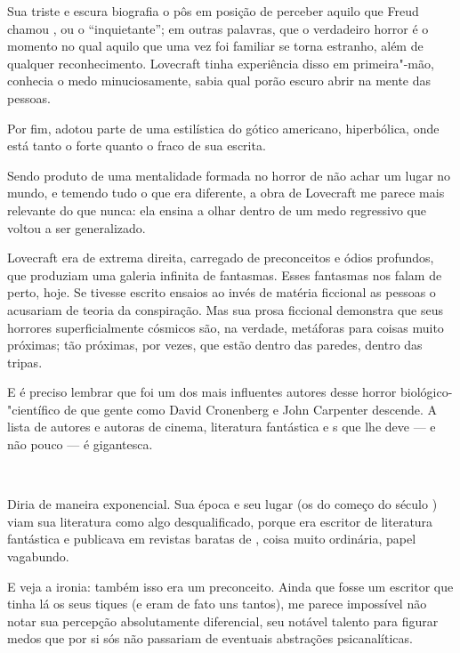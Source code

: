 \begin{changemargin}
Sua triste e escura biografia o pôs em posição de perceber aquilo que Freud chamou {}, ou o “inquietante”; em outras palavras, que o verdadeiro horror é o momento no qual aquilo que uma vez foi familiar se torna estranho, além de qualquer reconhecimento. Lovecraft tinha experiência disso em primeira"-mão, conhecia o medo minuciosamente, sabia qual porão escuro abrir na mente das pessoas.

Por fim, adotou parte de uma estilística do gótico americano, hiperbólica, onde está tanto o forte quanto o fraco de sua escrita.

\bigskip


Sendo produto de uma mentalidade formada no horror de não achar um lugar no mundo, e temendo tudo o que era diferente, a obra de Lovecraft me parece mais relevante do que nunca: ela ensina a olhar dentro de um medo regressivo que voltou a ser generalizado. 

Lovecraft era de extrema direita, carregado de preconceitos e ódios profundos, que produziam uma galeria infinita de fantasmas. Esses fantasmas nos falam de perto, hoje. Se tivesse escrito ensaios ao invés de matéria ficcional as pessoas o acusariam de teoria da conspiração. Mas sua prosa ficcional demonstra que seus horrores superficialmente cósmicos são, na verdade, metáforas para coisas muito próximas; tão próximas, por vezes, que estão dentro das paredes, dentro das tripas. 

E é preciso lembrar que foi um dos mais influentes autores desse horror biológico-"científico de que gente como David Cronenberg e John Carpenter descende. A lista de autores e autoras de cinema, literatura fantástica e s que lhe deve — e não pouco — é gigantesca. 

\bigskip 


Diria de maneira exponencial. Sua época e seu lugar (os  do começo do século ) viam sua literatura como algo desqualificado, porque era escritor de literatura fantástica e publicava em revistas baratas de {}, coisa muito ordinária, papel vagabundo. 

E veja a ironia: também isso era um preconceito. Ainda que fosse um escritor que tinha lá os seus tiques (e eram de fato uns tantos), me parece impossível não notar sua percepção absolutamente diferencial, seu notável talento para figurar medos que por si sós não passariam de eventuais abstrações psicanalíticas. 


\end{changemargin}
